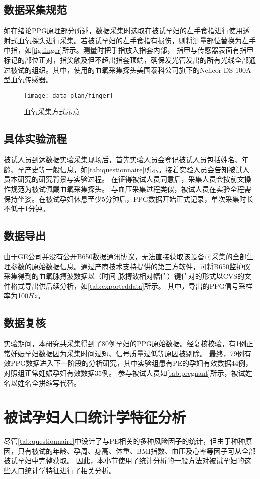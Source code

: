 \subsection{数据采集规范}
如在绪论PPG原理部分所述，数据采集时选取在被试孕妇的左手食指进行使用透射式血氧探头进行采集。若被试孕妇的左手食指有损伤，则将测量部位替换为左手中指，如\autoref{fig:finger}所示。测量时把手指放入指套内部，
指甲与传感器表面有指甲标记的部位正对，指尖触及但不超出指套顶端，确保发光管发出的所有光线全部通过被试的组织。其中，使用的血氧采集探头美国泰科公司旗下的Nellcor DS-100A型血氧传感器。 
\begin{figure}[htbp]
      \centering
      \texttt{[image: data\_plan/finger]}
      \caption{\label{fig:finger}血氧采集方式示意}
\end{figure}
\subsection{具体实验流程}
被试人员到达数据实验采集现场后，首先实验人员会登记被试人员包括姓名、年龄、孕产史等一般信息，如\autoref{tab:questionnaire}所示。接着实验人员会告知被试人员本研究的研究背景与实验过程。
在征得被试人员同意后，采集人员会按前文操作规范为被试佩戴血氧采集探头\cite{Chen2021}。
与血压采集过程类似\cite{FIGO}，被试人员在实验全程需保持坐姿。在被试孕妇休息至少5分钟后，PPG数据开始正式记录，单次采集时长不低于1分钟。
\subsection{数据导出}
由于GE公司并没有公开B650数据通讯协议，无法直接获取该设备可采集的全部生理参数的原始数据信息。通过产商技术支持提供的第三方软件，可将B650监护仪采集得到的血氧脉搏波数据以（时间-脉搏波相对幅值）键值对的形式以CVS的文件格式导出供后续分析，如\autoref{tab:exporteddata}所示。
其中，导出的PPG信号采样率为100$Hz$。
\subsection{数据复核}
实验期间，本研究共采集得到了80例孕妇的PPG原始数据。经复核校验，有1例正常妊娠孕妇数据因为采集时间过短、信号质量过低等原因被剔除。
最终，79例有效PPG数据进入下一阶段的分析研究，其中实验组患有PE的孕妇有效数据44例，对照组正常妊娠孕妇有效数据35例。
参与被试人员如\autoref{tab:pregnant}所示，被试姓名以姓名全拼缩写代替。
\section{被试孕妇人口统计学特征分析}
尽管\autoref{tab:questionnaire}中设计了与PE相关的多种风险因子的统计，但由于种种原因，只有被试的年龄、孕周、身高、体重、BMI指数、血压及心率等因子可从全部被试孕妇中完整获取。
因此，本小节使用了统计分析的一般方法对被试孕妇的这些人口统计学特征进行了相关分析。
